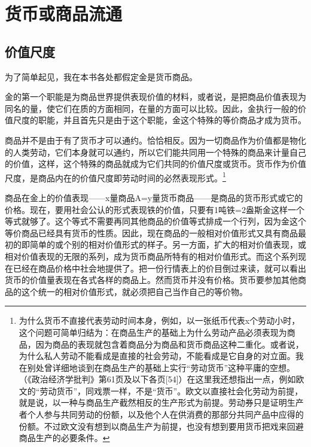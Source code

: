 \documentclass{ctexbook}
\begin{document}
\chapter{货币或商品流通}

    \section{价值尺度}

    为了简单起见，我在本书各处都假定金是货币商品。

    金的第一个职能是为商品世界提供表现价值的材料，或者说，是把商品价值表现为同名的量，使它们在质的方面相同，在量的方面可以比较。因此，金执行一般的价值尺度的职能，并且首先只是由于这个职能，金这个特殊的等价商品才成为货币。

    商品并不是由于有了货币才可以通约。恰恰相反。因为一切商品作为价值都是物化的人类劳动，它们本身就可以通约，所以它们能共同用一个特殊的商品来计量自己的价值，这样，这个特殊的商品就成为它们共同的价值尺度或货币。货币作为价值尺度，是商品内在的价值尺度即劳动时间的必然表现形式。\footnote{为什么货币不直接代表劳动时间本身，例如，以一张纸币代表x个劳动小时，这个问题可简单归结为：在商品生产的基础上为什么劳动产品必须表现为商品，因为商品的表现就包含着商品分为商品和货币商品这种二重化。或者说，为什么私人劳动不能看成是直接的社会劳动，不能看成是它自身的对立面。我在别处曾详细地谈到在商品生产的基础上实行“劳动货币”这种平庸的空想。（《政治经济学批判》第61页及以下各页[54]）在这里我还想指出一点，例如欧文的“劳动货币”，同戏票一样，不是“货币”。欧文以直接社会化劳动为前提，就是说，以一种与商品生产截然相反的生产形式为前提。劳动券只是证明生产者个人参与共同劳动的份额，以及他个人在供消费的那部分共同产品中应得的份额。不过欧文没有想到以商品生产为前提，也没有想到要用货币把戏来回避商品生产的必要条件。}

    商品在金上的价值表现——x量商品A=y量货币商品——是商品的货币形式或它的价格。现在，要用社会公认的形式表现铁的价值，只要有1吨铁=2盎斯金这样一个等式就够了。这个等式不需要再同其他商品的价值等式排成一个行列，因为金这个等价商品已经具有货币的性质。因此，现在商品的一般相对价值形式又具有商品最初的即简单的或个别的相对价值形式的样子。另一方面，扩大的相对价值表现，或相对价值表现的无限的系列，成为货币商品所特有的相对价值形式。而这个系列现在已经在商品价格中社会地提供了。把一份行情表上的价目倒过来读，就可以看出货币的价值量表现在各式各样的商品上。然而货币并没有价格。货币要参加其他商品的这个统一的相对价值形式，就必须把自己当作自己的等价物。
\end{document}
